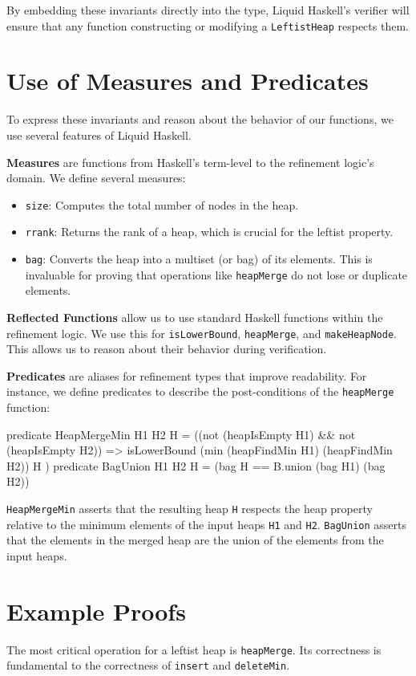 By embedding these invariants directly into the type, Liquid Haskell's verifier will ensure that any function constructing or modifying a \texttt{LeftistHeap} respects them.

\section{Use of Measures and Predicates}
To express these invariants and reason about the behavior of our functions, we use several features of Liquid Haskell.

\textbf{Measures} are functions from Haskell's term-level to the refinement logic's domain. We define several measures:
\begin{itemize}
    \item \texttt{size}: Computes the total number of nodes in the heap.
    \item \texttt{rrank}: Returns the rank of a heap, which is crucial for the leftist property.
    \item \texttt{bag}: Converts the heap into a multiset (or bag) of its elements. This is invaluable for proving that operations like \texttt{heapMerge} do not lose or duplicate elements.
\end{itemize}

\textbf{Reflected Functions} allow us to use standard Haskell functions within the refinement logic. We use this for \texttt{isLowerBound}, \texttt{heapMerge}, and \texttt{makeHeapNode}. This allows us to reason about their behavior during verification.

\textbf{Predicates} are aliases for refinement types that improve readability. For instance, we define predicates to describe the post-conditions of the \texttt{heapMerge} function:
\begin{code}
 predicate HeapMergeMin H1 H2 H = 
    ((not (heapIsEmpty H1) && not (heapIsEmpty H2)) => 
    isLowerBound (min (heapFindMin H1) (heapFindMin H2)) H )
 predicate BagUnion H1 H2 H = 
    (bag H == B.union (bag H1) (bag H2))
\end{code}
\texttt{HeapMergeMin} asserts that the resulting heap \texttt{H} respects the heap property relative to the minimum elements of the input heaps \texttt{H1} and \texttt{H2}. \texttt{BagUnion} asserts that the elements in the merged heap are the union of the elements from the input heaps.

\section{Example Proofs}
The most critical operation for a leftist heap is \texttt{heapMerge}. Its correctness is fundamental to the correctness of \texttt{insert} and \texttt{deleteMin}.

